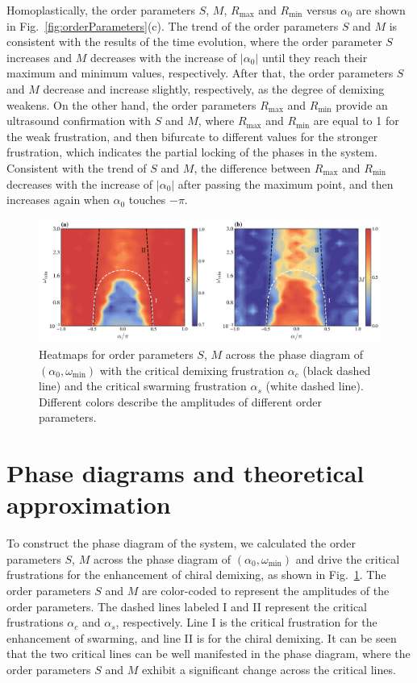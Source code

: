 \documentclass{article}
\begin{document}
Homoplastically, the order parameters $S$, $M$, $R_{\max}$ and $R_{\min}$ versus $\alpha_0$ are shown in Fig.~\ref{fig:orderParameters}(c). The trend of the order parameters $S$ and $M$ is consistent with the results of the time evolution, where the order parameter $S$ increases and $M$ decreases with the increase of $\left|\alpha_0\right|$ until they reach their maximum and minimum values, respectively. After that, the order parameters $S$ and $M$ decrease and increase slightly, respectively, as the degree of demixing weakens. On the other hand, the order parameters $R_{\max}$ and $R_{\min}$ provide an ultrasound confirmation with $S$ and $M$, where $R_{\max}$ and $R_{\min}$ are equal to 1 for the weak frustration, and then bifurcate to different values for the stronger frustration, which indicates the partial locking of the phases in the system.
Consistent with the trend of $S$ and $M$, the difference between $R_{\max}$ and $R_{\min}$ decreases with the increase of $\left|\alpha_0\right|$ after passing the maximum point, and then increases again when $\alpha_0$ touches $-\pi$.

\begin{figure}
    \includegraphics[width=\textwidth]{./figs/phaseDiagram.png}
    \caption{
        \label{fig:phaseDiagram} 
        Heatmaps for order parameters $S$, $M$ across the phase diagram of $(\alpha_0, \omega_{\min})$ with the critical demixing frustration $\alpha_{c}$ (black dashed line) and the critical swarming frustration $\alpha_{s}$ (white dashed line).
        Different colors describe the amplitudes of different order parameters.
    }
\end{figure}

\section{\label{sec:phaseDiagram}Phase diagrams and theoretical approximation}

To construct the phase diagram of the system, we calculated the order parameters $S$, $M$ across the phase diagram of $(\alpha_0, \omega_{\min})$ and drive the critical frustrations for the enhancement of chiral demixing, as shown in Fig.~\ref{fig:phaseDiagram}.
The order parameters $S$ and $M$ are color-coded to represent the amplitudes of the order parameters.
The dashed lines labeled I and II represent the critical frustrations $\alpha_{c}$ and $\alpha_{s}$, respectively. Line I is the critical frustration for the enhancement of swarming,  and line II is for the chiral demixing. It can be seen that the two critical lines can be well manifested in the phase diagram, where the order parameters $S$ and $M$ exhibit a significant change across the critical lines.
\end{document}
